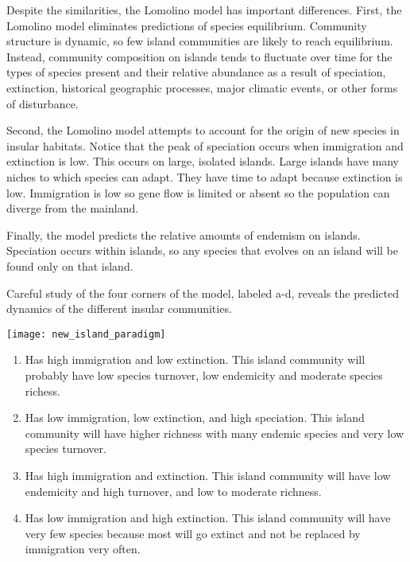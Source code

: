 \documentclass{tufte-handout}
\begin{document}
Despite the similarities, the Lomolino model has important differences. First, the Lomolino model eliminates predictions of species equilibrium.  Community structure is dynamic, so few island communities are likely to reach equilibrium.  Instead, community composition on islands tends to fluctuate over time for the  types of species present and their relative abundance as a result of speciation, extinction, historical geographic processes, major climatic events, or other forms of disturbance.

Second, the Lomolino model attempts to account for the origin of new species in insular habitats.  Notice that the peak of speciation occurs when immigration and extinction is low.  This occurs on large, isolated islands. Large islands have many niches to which species can adapt. They have time to adapt because extinction is low. Immigration is low so gene flow is limited or absent so the population can diverge from the mainland.

Finally, the model predicts the relative amounts of endemism on islands. Speciation occurs within islands, so any species that evolves on an island will be found only on that island.

Careful study of the four corners of the model, labeled a-d, reveals the predicted dynamics of the different insular communities.
\begin{marginfigure}%
	\texttt{[image: new\_island\_paradigm]}
\end{marginfigure} 

\begin{enumerate}[label=\alph*:]
	\item Has high immigration and low extinction.  This island community will probably have low species turnover, low endemicity and moderate species richess.

	\item Has low immigration, low extinction, and high speciation. This island community will have higher richness with many endemic species and very low species turnover.

	\item Has high immigration and extinction. This island community will have low endemicity and high turnover, and low to moderate richness.

	\item Has low immigration and high extinction.  This island community will have very few species because most will go extinct and not be replaced by immigration very often. 
\end{enumerate}

\end{document}
